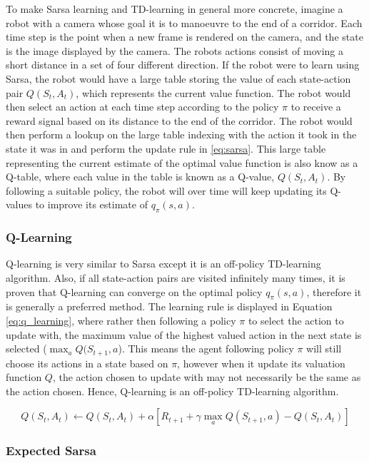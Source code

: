 \documentclass[../dissertation.tex]{subfiles}
\begin{document}
To make Sarsa learning and TD-learning in general more concrete, imagine a robot with a camera whose goal it is to manoeuvre to the end of a corridor. Each time step is the point when a new frame is rendered on the camera, and the state is the image displayed by the camera. The robots actions consist of moving a short distance in a set of four different direction. If the robot were to learn using Sarsa, the robot would have a large table storing the value of each state-action pair $Q(S_t, A_t)$, which represents the current value function. The robot would then select an action at each time step according to the policy $\pi$ to receive a reward signal based on its distance to the end of the corridor. The robot would then perform a lookup on the large table indexing with the action it took in the state it was in and perform the update rule in \ref{eq:sarsa}. This large table representing the current estimate of the optimal value function is also know as a Q-table, where each value in the table is known as a Q-value, $Q(S_t, A_t)$. By following a suitable policy, the robot will over time will keep updating its Q-values to improve
its estimate of $q_\pi(s,a)$.

\subsubsection{Q-Learning}

Q-learning is very similar to Sarsa except it is an off-policy TD-learning algorithm. Also, if all state-action pairs are visited infinitely many times, it is proven that Q-learning can converge on the optimal policy $q_\pi(s,a)$, therefore it is generally a preferred method. The learning rule is displayed in Equation \ref{eq:q_learning}, where rather then following a policy $\pi$ to select the action to update with, the maximum value of the highest valued action in the next state is selected ($\max_a Q(S_{t+1}, a$). This means the agent following policy $\pi$ will still choose its actions in a state based on $\pi$, however when it update its valuation function $Q$, the action chosen to update with may not necessarily be the same as the action chosen. Hence, Q-learning is an off-policy TD-learning algorithm.

\begin{equation}
Q(S_t, A_t) \leftarrow Q(S_t, A_t) + \alpha[R_{t+1} + \gamma \max_aQ(S_{t+1}, a) - Q(S_t, A_t)]
\end{equation}

\subsubsection{Expected Sarsa}
\end{document}
